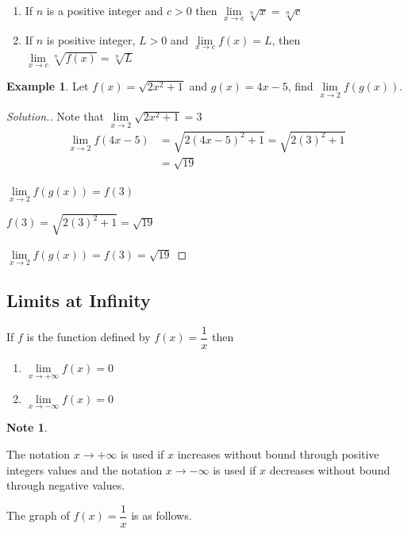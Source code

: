 \documentclass[11pt,a4paper]{article}
\theoremstyle{definition}
\newtheorem{exa}[thm]{Example}
\newtheorem*{note}{Note}
\newenvironment{solution}
  {\renewcommand{\qedsymbol}{}\begin{proof}[\textit{Solution}.]}
  {\end{proof}}
\begin{document}
\begin{enumerate}
\item If $n$ is a positive integer and $c > 0$ then $\displaystyle{\lim\limits_{x\rightarrow c} \sqrt[n]{x} = \sqrt[n]{c}}$

\item If $n$ is positive integer, $L>0$ and $\lim\limits_{x\rightarrow c} f(x) = L$, then $\lim\limits_{x\rightarrow c} \sqrt[n]{f(x)} = \sqrt[n]{L}$
\end{enumerate}


\begin{exa}
Let $f(x) = \sqrt{2x^2 + 1}$ and $g(x) = 4x - 5$, find $\lim\limits_{x\rightarrow 2} f(g(x))$.
\end{exa}

\begin{solution}

Note that $\lim\limits_{x\rightarrow 2} \sqrt{2x^2 + 1} = 3$
\begin{align*}
\lim\limits_{x\rightarrow 2} f(4x - 5) & = \sqrt{2(4x - 5)^2 + 1} = \sqrt{2(3)^2 + 1}\\
& = \sqrt{19}
\end{align*}

$\lim\limits_{x\rightarrow 2} f(g(x)) = f(3)$

$f(3) = \sqrt{2(3)^2 + 1} = \sqrt{19}$

$\lim\limits_{x\rightarrow 2} f(g(x)) = f(3) = \sqrt{19}$
\end{solution}

\subsection{Limits at Infinity}
If $f$ is the function defined by $f(x) = \dfrac{1}{x}$ then 
\begin{enumerate}
\item $\lim\limits_{x\rightarrow +\infty} f(x) = 0$

\item $\lim\limits_{x\rightarrow -\infty} f(x) = 0$
\end{enumerate}

\begin{note}
\end{note}


The notation $x \longrightarrow +\infty$ is used if $x$ increases without bound through positive integers values and the notation $x \longrightarrow - \infty$ is used if $x$ decreases without bound through negative values.


The graph of $f(x) = \dfrac{1}{x}$ is as follows.
\end{document}
